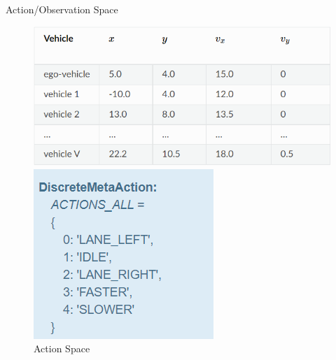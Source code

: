 \documentclass[final]{beamer}
\newlength{\onecolwid}
\begin{document}
\begin{frame}[t]
\begin{columns}[t]
\begin{column}{\onecolwid}
\begin{block}{Action/Observation Space}
\begin{figure}[!tbp]
    \vspace*{0.2cm}
    \centering
    \begin{minipage}[b]{0.5\textwidth}
      \includegraphics[width=\textwidth]{images/observation_space.png}
      \caption{Observation Space}
    \end{minipage}
    \hfill
    \begin{minipage}[b]{0.26\textwidth}
      \includegraphics[width=\textwidth]{images/action_space.png}
      \caption{Action Space}
    \end{minipage}
  \end{figure}

\end{block}

\end{column}


\end{columns}
\end{frame}
\end{document}
